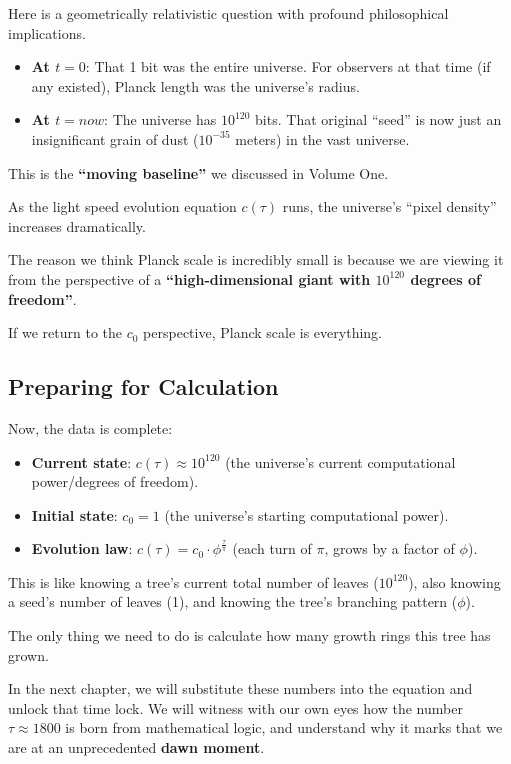 Here is a geometrically relativistic question with profound philosophical implications.

\begin{itemize}
\item \textbf{At $t=0$}: That 1 bit was the entire universe. For observers at that time (if any existed), Planck length was the universe's radius.

\item \textbf{At $t=now$}: The universe has $10^{120}$ bits. That original ``seed'' is now just an insignificant grain of dust ($10^{-35}$ meters) in the vast universe.
\end{itemize}

This is the \textbf{``moving baseline''} we discussed in Volume One.

As the light speed evolution equation $c(\tau)$ runs, the universe's ``pixel density'' increases dramatically.

The reason we think Planck scale is incredibly small is because we are viewing it from the perspective of a \textbf{``high-dimensional giant with $10^{120}$ degrees of freedom''}.

If we return to the $c_0$ perspective, Planck scale is everything.

\subsection{Preparing for Calculation}

Now, the data is complete:

\begin{itemize}
\item \textbf{Current state}: $c(\tau) \approx 10^{120}$ (the universe's current computational power/degrees of freedom).

\item \textbf{Initial state}: $c_0 = 1$ (the universe's starting computational power).

\item \textbf{Evolution law}: $c(\tau) = c_0 \cdot \phi^{\frac{\tau}{\pi}}$ (each turn of $\pi$, grows by a factor of $\phi$).
\end{itemize}

This is like knowing a tree's current total number of leaves ($10^{120}$), also knowing a seed's number of leaves (1), and knowing the tree's branching pattern ($\phi$).

The only thing we need to do is calculate how many growth rings this tree has grown.

In the next chapter, we will substitute these numbers into the equation and unlock that time lock. We will witness with our own eyes how the number \textbf{$\tau \approx 1800$} is born from mathematical logic, and understand why it marks that we are at an unprecedented \textbf{dawn moment}.

